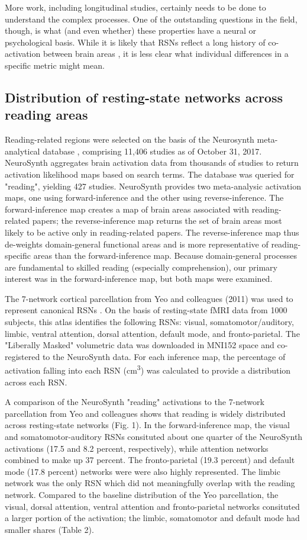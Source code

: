 More work, including longitudinal studies, certainly needs to be done to understand the complex processes. One of the outstanding questions in the field, though, is what (and even whether) these properties have a neural or psychological basis. While it is likely that RSNs reflect a long history of co-activation between brain areas \cite{Cohen2008, Fair2008}, it is less clear what individual differences in a specific metric might mean.


\subsection{Distribution of resting-state networks across reading areas}
Reading-related regions were selected on the basis of the Neurosynth meta-analytical database \cite{Yarkoni2011}, comprising 11,406 studies as of October 31, 2017. NeuroSynth aggregates brain activation data from thousands of studies to return activation likelihood maps based on search terms. The database was queried for "reading", yielding 427 studies. NeuroSynth provides two meta-analysic activation maps, one using forward-inference and the other using reverse-inference. The forward-inference map creates a map of brain areas associated with reading-related papers; the reverse-inference map returns the set of brain areas most likely to be active only in reading-related papers. The reverse-inference map thus de-weights domain-general functional areas and is more representative of reading-specific areas than the forward-inference map. Because domain-general processes are fundamental to skilled reading (especially comprehension), our primary interest was in the forward-inference map, but both maps were examined. 

The 7-network cortical parcellation from Yeo and colleagues (2011) was used to represent canonical RSNs \cite{Yeo2011}. On the basis of resting-state fMRI data from 1000 subjects, this atlas identifies the following RSNs: visual, somatomotor/auditory, limbic, ventral attention, dorsal attention, default mode, and fronto-parietal. The "Liberally Masked" volumetric data was downloaded in MNI152 space and co-registered to the NeuroSynth data. For each inference map, the percentage of activation falling into each RSN (cm\textsuperscript{3}) was calculated to provide a distribution across each RSN.

A comparison of the NeuroSynth "reading" activations to the 7-network parcellation from Yeo and colleagues shows that reading is widely distributed across resting-state networks (Fig. 1). In the forward-inference map, the visual and somatomotor-auditory RSNs consituted about one quarter of the NeuroSynth activations (17.5 and 8.2 percent, respectively), while attention networks combined to make up 37 percent. The fronto-parietal (19.3 percent) and default mode (17.8 percent) networks were were also highly represented. The limbic network was the only RSN which did not meaningfully overlap with the reading network. Compared to the baseline distribution of the Yeo parcellation, the visual, dorsal attention, ventral attention and fronto-parietal networks consituted a larger portion of the activation; the limbic, somatomotor and default mode had smaller shares (Table 2). 

